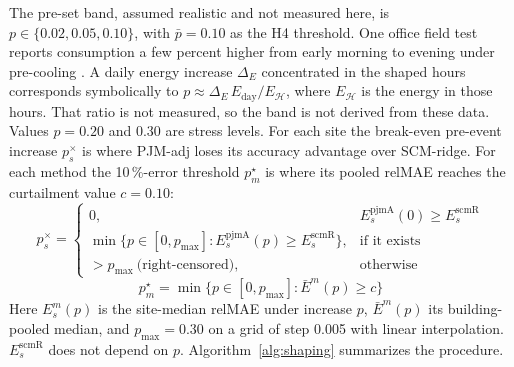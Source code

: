 The pre-set band, assumed realistic and not measured here, is $p\in\{0.02,0.05,0.10\}$, with $\bar{p}=0.10$ as the H4 threshold. One office field test reports consumption a few percent higher from early morning to evening under pre-cooling \cite{xu2009lbnl3898}. A daily energy increase $\Delta_E$ concentrated in the shaped hours corresponds symbolically to $p\approx\Delta_E\,E_{\mathrm{day}}/E_{\mathcal{H}}$, where $E_{\mathcal{H}}$ is the energy in those hours. That ratio is not measured, so the band is not derived from these data. Values $p=0.20$ and $0.30$ are stress levels. For each site the break-even pre-event increase $p^{\times}_s$ is where PJM-adj loses its accuracy advantage over SCM-ridge. For each method the 10\,\%-error threshold $p^{\star}_m$ is where its pooled relMAE reaches the curtailment value $c=0.10$:
\begin{equation}\label{eq:pcross}
p^{\times}_{s}=\begin{cases}0, & E^{\mathrm{pjmA}}_{s}(0)\ge E^{\mathrm{scmR}}_{s}\\ \min\{p\in[0,p_{\max}]:E^{\mathrm{pjmA}}_{s}(p)\ge E^{\mathrm{scmR}}_{s}\}, & \text{if it exists}\\ >p_{\max}\ \text{(right-censored)}, & \text{otherwise}\end{cases}
\end{equation}
\begin{equation}\label{eq:pstar}
p^{\star}_{m}=\min\{p\in[0,p_{\max}]:\bar{E}^{m}(p)\ge c\}
\end{equation}
Here $E^{m}_s(p)$ is the site-median relMAE under increase $p$, $\bar{E}^{m}(p)$ its building-pooled median, and $p_{\max}=0.30$ on a grid of step 0.005 with linear interpolation. $E^{\mathrm{scmR}}_s$ does not depend on $p$. Algorithm~\ref{alg:shaping} summarizes the procedure.

\begin{algorithm}[t]
\caption{ShapingStressTest: break-even pre-event increases and 10\,\%-error thresholds under pre-event shaping}\label{alg:shaping}
\end{algorithm}

